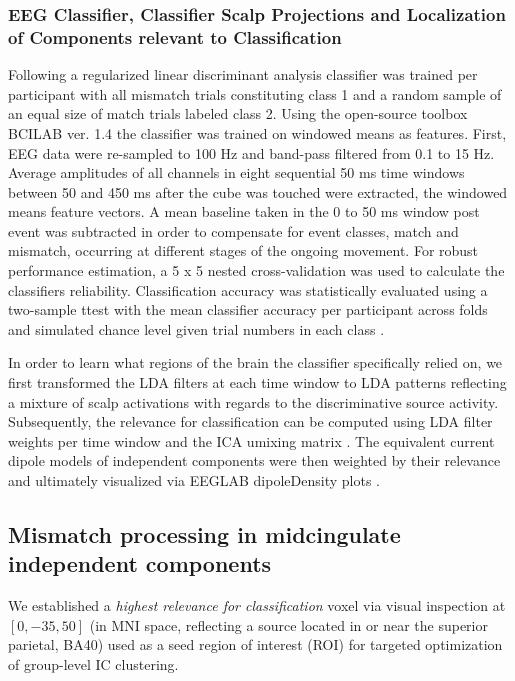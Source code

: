 \subsubsection{EEG Classifier, Classifier Scalp Projections and Localization of Components relevant to Classification}
Following \citet{Zander2016} a regularized linear discriminant analysis classifier was trained per participant with all mismatch trials constituting class 1 and a random sample of an equal size of match trials labeled class 2. Using the open-source toolbox BCILAB ver. 1.4 the classifier was trained on windowed means as features. First, EEG data were re-sampled to 100 Hz and band-pass filtered from 0.1 to 15 Hz. Average amplitudes of all channels in eight sequential 50 ms time windows between 50 and 450 ms after the cube was touched were extracted, the windowed means feature vectors. A mean baseline taken in the 0 to 50 ms window post event was subtracted in order to compensate for event classes, match and mismatch, occurring at different stages of the ongoing movement. For robust performance estimation, a 5 x 5 nested cross-validation was used to calculate the classifiers reliability. Classification accuracy was statistically evaluated using a two-sample ttest with the mean classifier accuracy per participant across folds and simulated chance level given trial numbers in each class \cite{Muller-Putz2007}.

In order to learn what regions of the brain the classifier specifically relied on, we first transformed the LDA filters at each time window to LDA patterns reflecting a mixture of scalp activations with regards to the discriminative source activity. Subsequently, the relevance for classification can be computed using LDA filter weights per time window and the ICA umixing matrix \cites{Haufe2014a, Zander2016}. The equivalent current dipole models of independent components were then weighted by their relevance and ultimately visualized via EEGLAB dipoleDensity plots \cite{Krol2019}. 

\subsection{Mismatch processing in midcingulate independent components}
We established a \textit{highest relevance for classification} voxel via visual inspection at $[0, -35, 50]$ (in MNI space, reflecting a source located in or near the superior parietal, BA40) used as a seed region of interest (ROI) for targeted optimization of group-level IC clustering.

